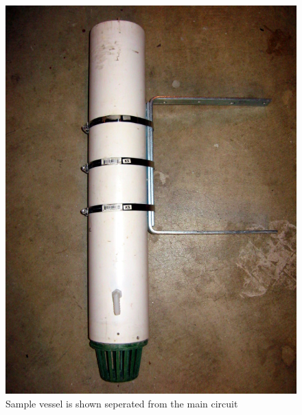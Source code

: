\begin{figure}
 \label{vesselPhoto}
\centering\includegraphics[scale=1.25]{vesselPhoto.jpg}
 \caption{Sample vessel is shown seperated from the main circuit}
\end{figure}


